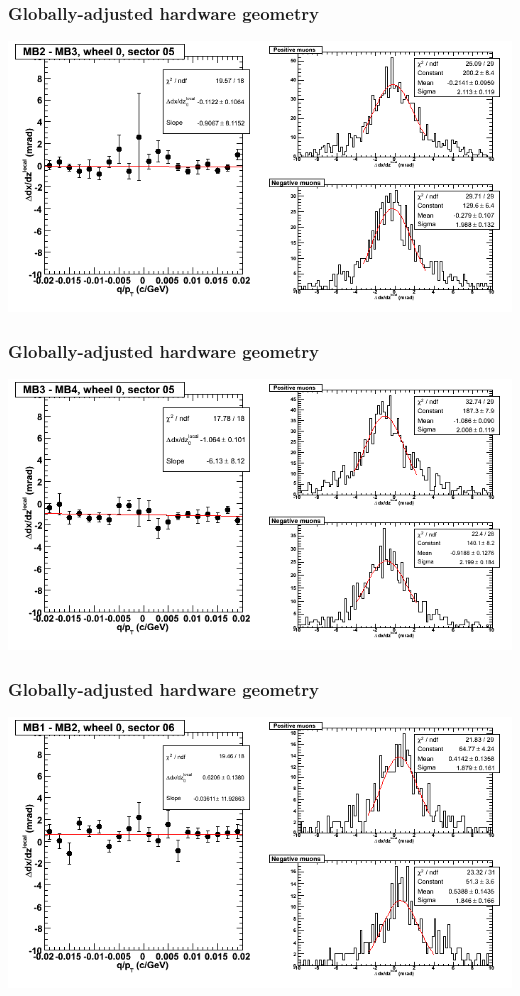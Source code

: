 \documentclass[compress]{beamer}
\begin{document}
\begin{frame}
\frametitle{Globally-adjusted hardware geometry}
\includegraphics[width=\linewidth]{NOV4_segdiffs_HW/dt13_slope_C_05_23.png}
\end{frame}

\begin{frame}
\frametitle{Globally-adjusted hardware geometry}
\includegraphics[width=\linewidth]{NOV4_segdiffs_HW/dt13_slope_C_05_34.png}
\end{frame}

\begin{frame}
\frametitle{Globally-adjusted hardware geometry}
\includegraphics[width=\linewidth]{NOV4_segdiffs_HW/dt13_slope_C_06_12.png}
\end{frame}
\end{document}
